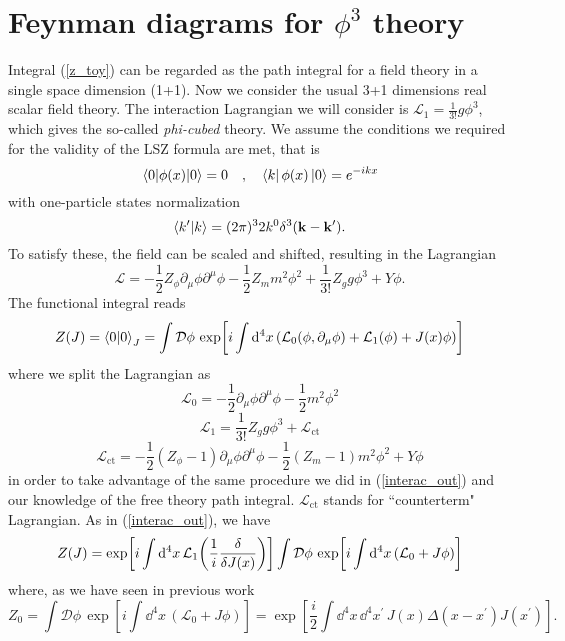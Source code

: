 \section{Feynman diagrams for $\phi^3$ theory}
Integral (\ref{z_toy}) can be regarded as the path integral for a field theory in a single space  dimension (1+1).  Now we consider the usual 3+1 dimensions real scalar field theory. The interaction Lagrangian we will consider is $\mathcal{L}_1=\frac{1}{3!}g\phi^3$, which gives the so-called \textit{phi-cubed} theory. We assume the conditions we required for the validity of the LSZ formula are met, that is
\begin{equation}
 \vev{\phi(x)}=0\quad,\quad \bra{k}{\phi(x)}\ket{0}=e^{-ikx} 
\end{equation}
with one-particle states normalization
\begin{equation}
    \braket{k^\prime}{k}=(2\pi)^32k^0\delta^3(\vb{k}-\vb{k}^\prime).
\end{equation}
To satisfy these, the field can be scaled and shifted, resulting in the Lagrangian
\begin{equation}
    \mathcal{L}=-\frac{1}{2}Z_\phi\partial_\mu\phi\partial^\mu\phi-\frac{1}{2}Z_mm^2\phi^2+\frac{1}{3!}Z_gg\phi^3+Y\phi.
\end{equation}
The functional integral reads
\begin{equation}
    Z(J)=\braket{0}_J=\int\mathcal{D}\phi\,\exp[i\int\dd^4 x\,(\mathcal{L}_0(\phi,\partial_\mu\phi)+\mathcal{L}_1(\phi)+J(x)\phi)]
    \label{path_integral_interacting}
\end{equation}
where we split the Lagrangian as 
\begin{equation}
    \mathcal{L}_0=-\frac{1}{2}\partial_\mu\phi\partial^\mu\phi-\frac{1}{2}m^2\phi^2
    \label{L_0}
\end{equation}
\begin{equation}
    \mathcal{L}_1=\frac{1}{3!}Z_g g \phi^3 + \mathcal{L}_{\text{ct}}
\end{equation}
\begin{equation}
    \mathcal{L}_{\text{ct}}=-\frac{1}{2}(Z_\phi -1)\partial_\mu\phi\partial^\mu\phi-\frac{1}{2}(Z_m-1)m^2\phi^2+Y\phi
    \label{L_ct}
\end{equation}
in order to take advantage of the same procedure we did in (\ref{interac_out}) and our knowledge of the free theory path integral. $\mathcal{L}_{\text{ct}}$ stands for ``counterterm" Lagrangian. As in (\ref{interac_out}), we have
\begin{equation}
    Z(J)=\exp[i\int\dd^4x\,\mathcal{L}_1\qty(\frac{1}{i}\fdv{J(x)})]\int\mathcal{D}\phi\, \exp[i\int\dd^4 x\,(\mathcal{L}_0+J\phi)]
    \label{interac_out_functional}
\end{equation}
where, as we have seen in previous work
\begin{equation}
    Z_0=\int\mathcal{D}\phi\, \exp[i\int\dd^4 x\,(\mathcal{L}_0+J\phi)]=\exp[\frac{i}{2}\int\dd^4x\,\dd^4x^\prime\,J(x)\Delta(x-x^\prime)J(x^\prime)].
\end{equation}

